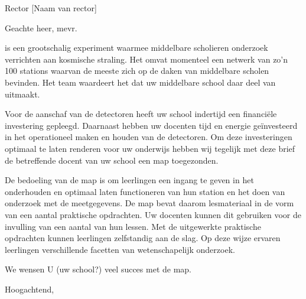 

\signature{Het \hisparc team}
\address{Science Park 105\\
         1098 XG \\
         Amsterdam}



\begin{letter}{Rector [Naam van rector] \\ [adres van school]}
 
\opening{Geachte heer, mevr.} %

\hisparc is een grootschalig experiment waarmee middelbare scholieren
onderzoek verrichten aan kosmische straling. Het omvat momenteel een
netwerk van zo'n 100 stations waarvan de meeste zich op de daken van
middelbare scholen bevinden. Het \hisparc team waardeert het dat uw
middelbare school daar deel van uitmaakt.  

Voor de aanschaf van de detectoren heeft uw school indertijd een
financiële investering gepleegd. Daarnaast hebben uw docenten tijd en
energie geïnvesteerd in het operationeel maken en houden van de
detectoren. Om deze investeringen optimaal te laten renderen voor uw
onderwijs hebben wij tegelijk met deze brief de betreffende docent van
uw school een \hisparc map toegezonden.

De bedoeling van de \hisparc map is om leerlingen een ingang te geven in
het onderhouden en optimaal laten functioneren van hun \hisparc station
en het doen van onderzoek met de meetgegevens. De \hisparc map bevat
daarom lesmateriaal in de vorm van een aantal praktische opdrachten. Uw
docenten kunnen dit gebruiken voor de invulling van een aantal van hun
lessen. Met de uitgewerkte praktische opdrachten kunnen leerlingen
zelfstandig aan de slag. Op deze wijze ervaren leerlingen verschillende
facetten van wetenschapelijk onderzoek. 

We wensen U (uw school?) veel succes met de \hisparc map.
 
\closing{Hoogachtend,}


\end{letter}

